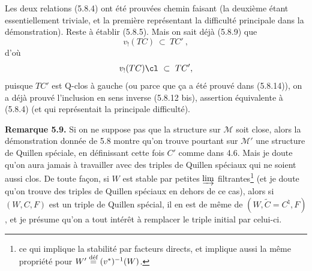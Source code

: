 Les deux relations (5.8.4) ont été prouvées chemin faisant (la deuxième étant essentiellement triviale, et la première représentant la difficulté principale dans la démonstration). Reste à établir (5.8.5). Mais on sait déjà (5.8.9) que
\[
v_!(TC) \ \subset \ TC'\ ,
\]
d'où
\[
v_!(TC)\cl \ \subset \ TC',
\]
puisque $TC'$ est Q-clos à gauche (ou parce que ça a été prouvé dans (5.8.14)), on a déjà prouvé l'inclusion en sens inverse (5.8.12 bis), assertion équivalente à (5.8.4) (et qui représentait la principale difficulté).

\textbf{Remarque 5.9.} Si on ne suppose pas que la structure sur $\mathcal{M}$ soit close, alors la démonstration donnée de 5.8 montre qu'on trouve pourtant sur $\mathcal{M}'$ une structure de Quillen spéciale, en définissant cette fois $C'$ comme dans 4.6. Mais je doute qu'on aura jamais à travailler avec des triples de Quillen spéciaux qui ne soient aussi clos. De toute façon, si $W$ est stable par petites $\varinjlim$ filtrantes\footnote[28]{ce qui implique la stabilité par facteurs directs, et implique aussi la même propriété pour $W' \defeq (v^*)^{-1}(W)$.} (et je doute qu'on trouve des triples de Quillen spéciaux en dehors de ce cas), alors si $(W, C, F)$ est un triple de Quillen spécial, il en est de même de $(W, \tilde{C} = C^\natural, F)$, et je présume qu'on a tout intérêt à remplacer le triple initial par celui-ci. %

